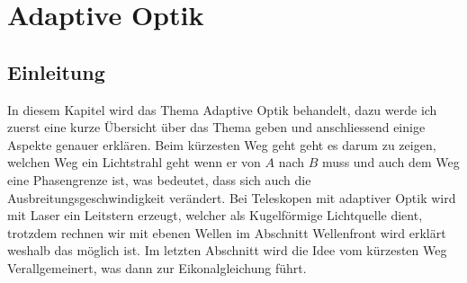 \chapter{Adaptive Optik\label{chapter:thema}}
\begin{refsection}

\section{Einleitung}
In diesem Kapitel wird das Thema Adaptive Optik behandelt, dazu werde ich zuerst eine kurze Übersicht über das Thema geben und anschliessend einige Aspekte genauer erklären. Beim kürzesten Weg geht geht es darum zu zeigen, welchen Weg ein Lichtstrahl geht wenn er von $A$ nach $B$ muss und auch dem Weg eine Phasengrenze ist, was bedeutet, dass sich auch die Ausbreitungsgeschwindigkeit verändert. Bei Teleskopen mit adaptiver Optik wird mit Laser ein Leitstern erzeugt, welcher als Kugelförmige Lichtquelle dient, trotzdem rechnen wir mit ebenen Wellen im Abschnitt Wellenfront wird erklärt weshalb das möglich ist. Im letzten Abschnitt wird die Idee vom kürzesten Weg Verallgemeinert, was dann zur Eikonalgleichung führt. 


\end{refsection}
